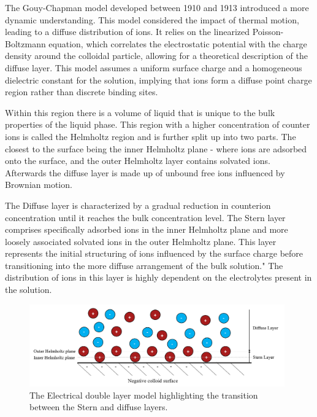 The Gouy-Chapman model developed between 1910 and 1913 introduced a more dynamic understanding. This model considered the impact of thermal motion, leading to a diffuse distribution of ions. It relies on the linearized Poisson-Boltzmann equation, which correlates the electrostatic potential with the charge density around the colloidal particle, allowing for a theoretical description of the diffuse layer. This model assumes a uniform surface charge and a homogeneous dielectric constant for the solution, implying that ions form a diffuse point charge region rather than discrete binding sites.


Within this region there is a volume of liquid that is unique to the bulk properties of the liquid phase. This region with a higher concentration of counter ions is called the Helmholtz region and is further split up into two parts. The closest to the surface being the inner Helmholtz plane - where ions are adsorbed onto the surface, and the outer Helmholtz layer contains solvated ions. Afterwards the diffuse layer is made up of unbound free ions influenced by Brownian motion.

The Diffuse layer is characterized by a gradual reduction in counterion concentration until it reaches the bulk concentration level. The Stern layer comprises specifically adsorbed ions in the inner Helmholtz plane and more loosely associated solvated ions in the outer Helmholtz plane. This layer represents the initial structuring of ions influenced by the surface charge before transitioning into the more diffuse arrangement of the bulk solution." The distribution of ions in this layer is highly dependent on the electrolytes present in the solution.

\begin{figure}[h]     %
        \begin{center}
          \includegraphics[width=110mm]{chapter1/SternLayer.PNG}
\end{center}
\caption{The Electrical double layer model highlighting the transition between the Stern and diffuse layers.}
\label{fig:Stern}                 %
\end{figure}



